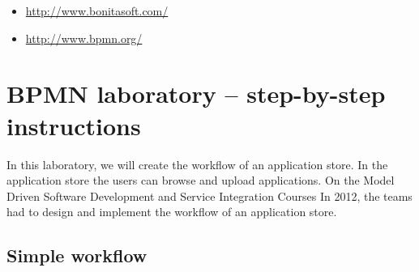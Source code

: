 \documentclass[]{report}
\begin{document}
\begin{itemize}
\itemsep1pt\parskip0pt
\item
  \url{http://www.bonitasoft.com/}
\item
  \url{http://www.bpmn.org/}
\end{itemize}

\chapter{BPMN laboratory -- step-by-step instructions}

In this laboratory, we will create the workflow of an application store.
In the application store the users can browse and upload applications.
On the Model Driven Software Development and Service Integration Courses
In 2012, the teams had to design and implement the workflow of an
application store.

\section{Simple workflow}
\end{document}
